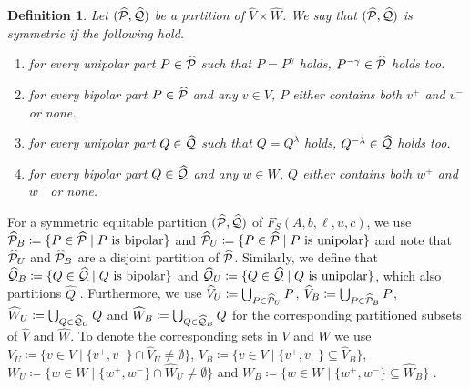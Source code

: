 \documentclass[pdflatex,sn-mathphys-num]{sn-jnl}%
\theoremstyle{thmstyleone}%
\newtheorem{definition}{Definition}
\theoremstyle{thmstylethree}%
\theoremstyle{thmstyletwo}%
\begin{document}
\begin{definition}
    \label{def_symmetric}
    Let $(\widehat{\mathcal{P}},\widehat{\mathcal{Q}})$ be a partition of $\widehat{V}\times \widehat{W}$. We say that $(\widehat{\mathcal{P}},\widehat{\mathcal{Q}})$ is \emph{symmetric} if the following hold.

    \begin{enumerate}[label=(\roman*)]
        \item for every unipolar part $P\in \widehat{\mathcal{P}}$ such that $P =P^\gamma $ holds, $P^{-\gamma} \in \widehat{\mathcal{P}}$ holds too. \label{def_symmetric_row_unipolar}
        \item for every bipolar part $P\in \widehat{\mathcal{P}}$ and any $v\in V$, $P$ either contains both $v^+$ and $v^-$ or none. \label{def_symmetric_row_bipolar} 
        \item for every unipolar part $Q\in \widehat{\mathcal{Q}}$ such that $Q =Q^\lambda$ holds, $Q^{-\lambda} \in \widehat{\mathcal{Q}}$ holds too. \label{def_symmetric_col_unipolar}
        \item for every bipolar part $Q\in \widehat{\mathcal{Q}}$ and any $w\in W$, $Q$ either contains both $w^+$ and $w^-$ or none. \label{def_symmetric_col_bipolar}
    \end{enumerate}
\end{definition}
For a symmetric equitable partition $(\widehat{\mathcal{P}},\widehat{\mathcal{Q}})$ of $F_S(A,b,\ell,u,c)$, we use $\widehat{\MP}_B \coloneqq \{P \in \widehat{\MP} \mid P \text{ is bipolar}\}$ and $\widehat{\MP}_U \coloneqq \{P\in \widehat{\MP} \mid P \text{ is unipolar}\}$ and note that $\widehat{\mathcal{P}}_U$ and $\widehat{\mathcal{P}}_B$ are a disjoint partition of $\widehat{\mathcal{P}}$. 
Similarly, we define that $\widehat{\MQ}_B \coloneqq \{Q \in \widehat{\MQ} \mid Q \text{ is bipolar}\}$ and $\widehat{\MQ}_U \coloneqq \{Q \in\widehat{\MQ} \mid Q \text{ is unipolar}\}$, which also partitions $\widehat{Q}$ . Furthermore, we use $\widehat{V}_U \coloneqq \bigcup_{P\in \widehat{\MP}_U} P$, $\widehat{V}_B \coloneqq \bigcup_{P\in \widehat{\MP}_B} P$, $\widehat{W}_U \coloneqq \bigcup_{Q\in \widehat{\MQ}_U} Q$ and $\widehat{W}_B \coloneqq \bigcup_{Q\in \widehat{\MQ}_B} Q$ for the corresponding partitioned subsets of $\widehat{V}$ and $\widehat{W}$. To denote the corresponding sets in $V$ and $W$ we use $V_U \coloneqq \{v \in V \mid \{v^+,v^-\}\cap \widehat{V}_U\neq\emptyset\}$, $V_B \coloneqq \{v \in V \mid \{v^+,v^-\}\subseteq \widehat{V}_B\}$, $W_U \coloneqq \{w \in W \mid \{w^+,w^-\}\cap \widehat{W}_U\neq\emptyset\}$ and $W_B \coloneqq \{w \in W \mid \{w^+,w^-\}\subseteq\widehat{W}_B\}$ .
    
\end{document}
